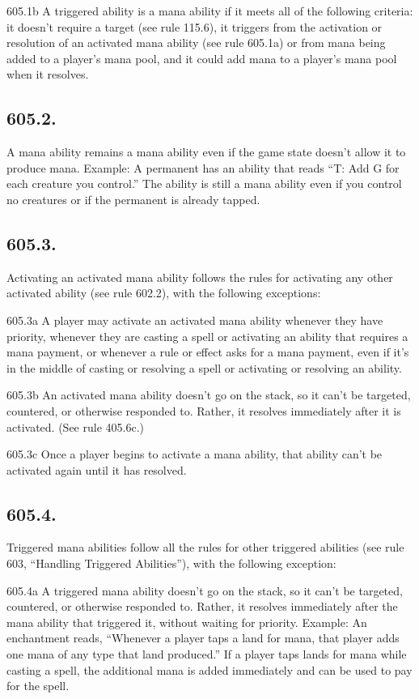 605.1b A triggered ability is a mana ability if it meets all of the following criteria: it doesn’t require a target (see rule 115.6), it triggers from the activation or resolution of an activated mana ability (see rule 605.1a) or from mana being added to a player’s mana pool, and it could add mana to a player’s mana pool when it resolves.

\subsection*{605.2.}
A mana ability remains a mana ability even if the game state doesn’t allow it to produce mana.
Example: A permanent has an ability that reads “{T}: Add {G} for each creature you control.” The ability is still a mana ability even if you control no creatures or if the permanent is already tapped.

\subsection*{605.3.}
Activating an activated mana ability follows the rules for activating any other activated ability (see rule 602.2), with the following exceptions:

605.3a A player may activate an activated mana ability whenever they have priority, whenever they are casting a spell or activating an ability that requires a mana payment, or whenever a rule or effect asks for a mana payment, even if it’s in the middle of casting or resolving a spell or activating or resolving an ability.

605.3b An activated mana ability doesn’t go on the stack, so it can’t be targeted, countered, or otherwise responded to. Rather, it resolves immediately after it is activated. (See rule 405.6c.)

605.3c Once a player begins to activate a mana ability, that ability can’t be activated again until it has resolved.

\subsection*{605.4.}
Triggered mana abilities follow all the rules for other triggered abilities (see rule 603, “Handling Triggered Abilities”), with the following exception:

605.4a A triggered mana ability doesn’t go on the stack, so it can’t be targeted, countered, or otherwise responded to. Rather, it resolves immediately after the mana ability that triggered it, without waiting for priority.
Example: An enchantment reads, “Whenever a player taps a land for mana, that player adds one mana of any type that land produced.” If a player taps lands for mana while casting a spell, the additional mana is added immediately and can be used to pay for the spell.

